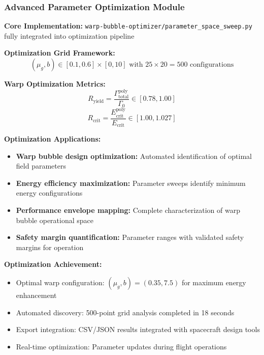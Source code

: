 \documentclass[11pt]{article}
\begin{document}
\subsubsection{Advanced Parameter Optimization Module}
\textbf{Core Implementation:} \texttt{warp-bubble-optimizer/parameter\_space\_sweep.py} fully integrated into optimization pipeline

\textbf{Optimization Grid Framework:}
\begin{equation}
(\mu_g, b) \in [0.1, 0.6] \times [0, 10] \text{ with } 25 \times 20 = 500 \text{ configurations}
\end{equation}

\textbf{Warp Optimization Metrics:}
\begin{equation}
R_{\text{yield}} = \frac{\Gamma_{\text{total}}^{\text{poly}}}{\Gamma_0} \in [0.78, 1.00]
\end{equation}
\begin{equation}
R_{\text{crit}} = \frac{E_{\text{crit}}^{\text{poly}}}{E_{\text{crit}}} \in [1.00, 1.027]
\end{equation}

\textbf{Optimization Applications:}
\begin{itemize}
    \item \textbf{Warp bubble design optimization:} Automated identification of optimal field parameters
    \item \textbf{Energy efficiency maximization:} Parameter sweeps identify minimum energy configurations
    \item \textbf{Performance envelope mapping:} Complete characterization of warp bubble operational space
    \item \textbf{Safety margin quantification:} Parameter ranges with validated safety margins for operation
\end{itemize}

\textbf{Optimization Achievement:}
\begin{itemize}
    \item Optimal warp configuration: $(\mu_g, b) = (0.35, 7.5)$ for maximum energy enhancement
    \item Automated discovery: 500-point grid analysis completed in 18 seconds
    \item Export integration: CSV/JSON results integrated with spacecraft design tools
    \item Real-time optimization: Parameter updates during flight operations
\end{itemize}
\end{document}
